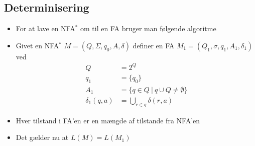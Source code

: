 \documentclass[a4, danish]{article}
\begin{document}
\subsection{Determinisering}
\begin{itemize}
  \item For at lave en NFA$^*$ om til en FA bruger man følgende algoritme
  \item Givet en NFA$^*$ $M=(Q,\Sigma,q_0,A,\delta)$ definer en FA $M_1=(Q_1,\sigma, q_1,A_1,\delta_1)$ ved 
  \begin{align*}
    Q &= 2^Q \\
    q_1 &= \{q_0\} \\
    A_1 &= \{ q\in Q \ | \ q \cup Q \neq \emptyset \} \\
    \delta_1(q,a)&=\bigcup_{r\in q}\delta(r,a)
  \end{align*}
  \item Hver tilstand i FA'en er en mængde af tilstande fra NFA'en
  \item Det gælder nu at $L(M)=L(M_1)$
\end{itemize}
\end{document}
